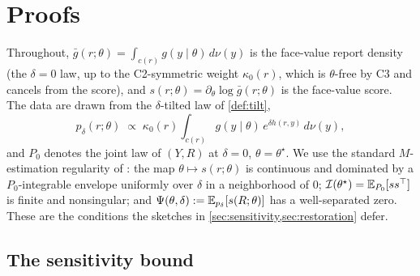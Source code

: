 \appendix

\section{Proofs}
\label{app:proofs}

Throughout, $\bar g(r; \theta) = \int_{c(r)} g(y \mid \theta)\, d\nu(y)$ is the
face-value report density (the $\delta = 0$ law, up to the C2-symmetric weight
$\kappa_0(r)$, which is $\theta$-free by C3 and cancels from the score), and
$s(r; \theta) = \partial_\theta \log \bar g(r; \theta)$ is the face-value score.
The data are drawn from the $\delta$-tilted law of \cref{def:tilt},
\begin{equation}
  p_\delta(r; \theta) \;\propto\; \kappa_0(r) \int_{c(r)} g(y \mid \theta)\, e^{\delta h(r,y)}\,
    d\nu(y),
  \label{eq:app-tilted}
\end{equation}
and $P_0$ denotes the joint law of $(Y, R)$ at $\delta = 0$, $\theta = \theta^\star$.
We use the standard $M$-estimation regularity of \citet[Ch.~5]{vandervaart1998asymptotic}:
the map $\theta \mapsto s(r; \theta)$ is continuous and dominated by a $P_0$-integrable
envelope uniformly over $\delta$ in a neighborhood of $0$; $\mathcal{I}(\theta^\star) =
\mathbb{E}_{P_0}[s s^\top]$ is finite and nonsingular; and $\Psi(\theta, \delta) :=
\mathbb{E}_{p_\delta}[s(R; \theta)]$ has a well-separated zero. These are the conditions the
sketches in \cref{sec:sensitivity,sec:restoration} defer.

\subsection{The sensitivity bound}
\label{app:sensitivity}

